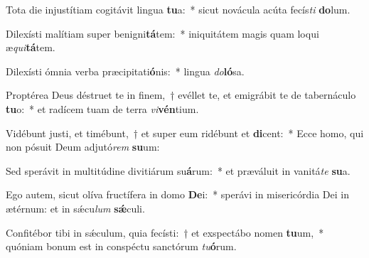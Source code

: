 \item Tota die injustítiam cogitávit lingua \textbf{tu}a:~* sicut novácula acúta fecís\textit{ti} \textbf{do}lum.
\item Dilexísti malítiam super benigni\textbf{tá}tem:~* iniquitátem magis quam loqui æ\textit{qui}\textbf{tá}tem.
\item Dilexísti ómnia verba præcipitati\textbf{ó}nis:~* lingua \textit{do}\textbf{ló}sa.
\item Proptérea Deus déstruet te in finem,~† evéllet te, et emigrábit te de tabernáculo \textbf{tu}o:~* et radícem tuam de terra \textit{vi}\textbf{vén}tium.
\item Vidébunt justi, et timébunt,~† et super eum ridébunt et \textbf{di}cent:~* Ecce homo, qui non pósuit Deum adjutó\textit{rem} \textbf{su}um:
\item Sed sperávit in multitúdine divitiárum su\textbf{á}rum:~* et præváluit in vanitá\textit{te} \textbf{su}a.
\item Ego autem, sicut olíva fructífera in domo \textbf{De}i:~* sperávi in misericórdia Dei in ætérnum: et in sǽcu\textit{lum} \textbf{sǽ}culi.
\item Confitébor tibi in sǽculum, quia fecísti:~† et exspectábo nomen \textbf{tu}um,~* quóniam bonum est in conspéctu sanctórum \textit{tu}\textbf{ó}rum.
